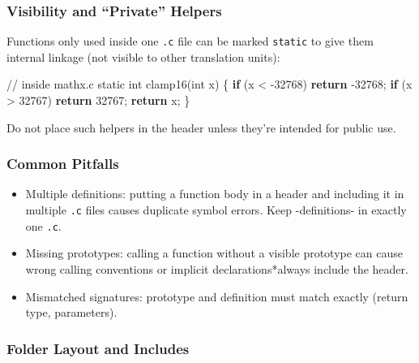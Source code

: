 \documentclass[
  letterpaper,
  DIV=11,
  numbers=noendperiod]{scrreprt}
\newenvironment{Shaded}{\begin{snugshade}}{\end{snugshade}}
\newcommand{\CommentTok}[1]{\textcolor[rgb]{0.37,0.37,0.37}{#1}}
\newcommand{\ControlFlowTok}[1]{\textcolor[rgb]{0.00,0.23,0.31}{\textbf{#1}}}
\newcommand{\DataTypeTok}[1]{\textcolor[rgb]{0.68,0.00,0.00}{#1}}
\newcommand{\DecValTok}[1]{\textcolor[rgb]{0.68,0.00,0.00}{#1}}
\newcommand{\NormalTok}[1]{\textcolor[rgb]{0.00,0.23,0.31}{#1}}
\newcommand{\OperatorTok}[1]{\textcolor[rgb]{0.37,0.37,0.37}{#1}}
\providecommand{\tightlist}{%
  \setlength{\itemsep}{0pt}\setlength{\parskip}{0pt}}
\begin{document}
\subsubsection{Visibility and ``Private''
Helpers}\label{visibility-and-private-helpers}

Functions only used inside one \texttt{.c} file can be marked
\texttt{static} to give them internal linkage (not visible to other
translation units):

\begin{Shaded}
\begin{Highlighting}[]
\CommentTok{// inside mathx.c}
\DataTypeTok{static} \DataTypeTok{int}\NormalTok{ clamp16}\OperatorTok{(}\DataTypeTok{int}\NormalTok{ x}\OperatorTok{)} \OperatorTok{\{}
    \ControlFlowTok{if} \OperatorTok{(}\NormalTok{x }\OperatorTok{\textless{}} \OperatorTok{{-}}\DecValTok{32768}\OperatorTok{)} \ControlFlowTok{return} \OperatorTok{{-}}\DecValTok{32768}\OperatorTok{;}
    \ControlFlowTok{if} \OperatorTok{(}\NormalTok{x }\OperatorTok{\textgreater{}}  \DecValTok{32767}\OperatorTok{)} \ControlFlowTok{return}  \DecValTok{32767}\OperatorTok{;}
    \ControlFlowTok{return}\NormalTok{ x}\OperatorTok{;}
\OperatorTok{\}}
\end{Highlighting}
\end{Shaded}

Do not place such helpers in the header unless they're intended for
public use.

\subsubsection{Common Pitfalls}\label{common-pitfalls}

\begin{itemize}
\tightlist
\item
  Multiple definitions: putting a function body in a header and
  including it in multiple \texttt{.c} files causes duplicate symbol
  errors. Keep -definitions- in exactly one \texttt{.c}.
\item
  Missing prototypes: calling a function without a visible prototype can
  cause wrong calling conventions or implicit declarations*always
  include the header.
\item
  Mismatched signatures: prototype and definition must match exactly
  (return type, parameters).
\end{itemize}

\subsubsection{Folder Layout and
Includes}\label{folder-layout-and-includes}
\end{document}
